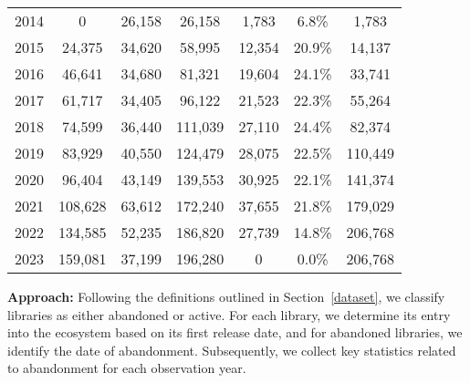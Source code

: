 \begin{table*}[h]
\begin{tabular}{ccccccc}
2014 & 0      & 26,158 & 26,158  & 1,783   & 6.8\% & 1,783  \\ 
2015 & 24,375  & 34,620 & 58,995  & 12,354  & 20.9\% & 14,137 \\ 
2016 & 46,641  & 34,680 & 81,321  & 19,604  & 24.1\% & 33,741  \\ 
2017 & 61,717  & 34,405 & 96,122  & 21,523  & 22.3\% & 55,264 \\ 
2018 & 74,599  & 36,440 & 111,039 & 27,110  & 24.4\% & 82,374 \\ 
2019 & 83,929  & 40,550 & 124,479 & 28,075  & 22.5\% & 110,449 \\ 
2020 & 96,404  & 43,149 & 139,553 & 30,925  & 22.1\% & 141,374 \\ 
2021 & 108,628 & 63,612 & 172,240 & 37,655  & 21.8\% & 179,029  \\ 
2022 & 134,585 & 52,235 & 186,820 & 27,739  & 14.8\% & 206,768\\ 
2023 & 159,081 & 37,199 & 196,280 & 0  & 0.0\% & 206,768 \\ \hline
\end{tabular}
\vspace{-0.2cm}
\end{table*}

\noindent \textbf{Approach:} Following the definitions outlined in Section~\ref{dataset}, we classify libraries as either abandoned or active. For each library, we determine its entry into the ecosystem based on its first release date, and for abandoned libraries, we identify the date of abandonment. Subsequently, we collect key statistics related to abandonment for each observation year.



